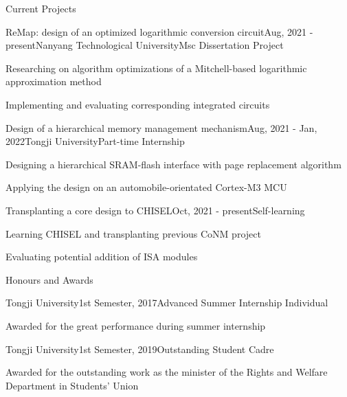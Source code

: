 \documentclass{resume} %
\begin{document}
\begin{rSection}{Current Projects}
	
	\begin{rSubsection}{ReMap: design of an optimized logarithmic conversion circuit}{Aug, 2021 - present}{Nanyang Technological University}{Msc Dissertation Project}
		\item Researching on algorithm optimizations of a Mitchell-based logarithmic approximation method
		\item Implementing and evaluating corresponding integrated circuits
	\end{rSubsection}

	\begin{rSubsection}{Design of a hierarchical memory management mechanism}{Aug, 2021 - Jan, 2022}{Tongji University}{Part-time Internship}
		\item Designing a hierarchical SRAM-flash interface with page replacement algorithm
		\item Applying the design on an automobile-orientated Cortex-M3 MCU
	\end{rSubsection}

\newpage
	
	\begin{rSubsection}{Transplanting a core design to CHISEL}{Oct, 2021 - present}{Self-learning}{}
		\item Learning CHISEL and transplanting previous CoNM project
		\item Evaluating potential addition of ISA modules
	\end{rSubsection}

\end{rSection}

\begin{rSection}{Honours and Awards}
	
	\begin{rSubsection}{Tongji University}{1st Semester, 2017}{Advanced Summer Internship Individual}{}
		\item Awarded for the great performance during summer internship
	\end{rSubsection}
		
	\begin{rSubsection}{Tongji University}{1st Semester, 2019}{Outstanding Student Cadre}{}
		\item Awarded for the outstanding work as the minister of the Rights and Welfare Department in Students' Union
	\end{rSubsection}

\end{rSection}
\end{document}
